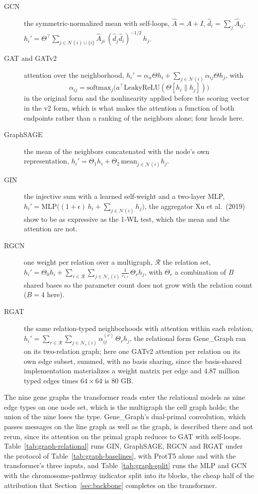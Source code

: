 \begin{description}
  \item[GCN] the symmetric-normalized mean with self-loops, $\hat A = A + I$,
    $\hat d_i = \sum_j \hat A_{ij}$:
    $h_i' = \Theta^{\top} \sum_{j \in \mathcal{N}(i) \cup \{i\}}
    \hat A_{ji}\,(\hat d_j \hat d_i)^{-1/2}\, h_j$.
  \item[GAT and GATv2] attention over the neighborhood,
    $h_i' = \alpha_{ii}\Theta h_i + \sum_{j \in \mathcal{N}(i)} \alpha_{ij}\Theta h_j$,
    with
    \begin{equation*}
      \alpha_{ij} = \mathrm{softmax}_j\big(a^{\top}\mathrm{LeakyReLU}(\Theta[h_i \| h_j])\big)
    \end{equation*}
    in the original form and the nonlinearity applied before the scoring vector in the
    v2 form, which is what makes the attention a function of both endpoints rather
    than a ranking of the neighbors alone; four heads here.
  \item[GraphSAGE] the mean of the neighbors concatenated with the node's own
    representation, $h_i' = \Theta_1 h_i + \Theta_2\,\mathrm{mean}_{j \in \mathcal{N}(i)} h_j$.
  \item[GIN] the injective sum with a learned self-weight and a two-layer MLP,
    $h_i' = \mathrm{MLP}\big((1 + \epsilon)\,h_i + \sum_{j \in \mathcal{N}(i)} h_j\big)$,
    the aggregator Xu et al.\ (2019) show to be as expressive as the 1-WL test, which
    the mean and the attention are not.
  \item[RGCN] one weight per relation over a multigraph, $\mathcal{R}$ the relation set,
    $h_i' = \Theta_0 h_i + \sum_{r \in \mathcal{R}} \sum_{j \in \mathcal{N}_r(i)}
    \frac{1}{c_{i,r}}\,\Theta_r h_j$, with $\Theta_r$ a combination of $B$ shared bases
    so the parameter count does not grow with the relation count ($B = 4$ here).
  \item[RGAT] the same relation-typed neighborhoods with attention within each
    relation, $h_i' = \sum_{r \in \mathcal{R}} \sum_{j \in \mathcal{N}_r(i)}
    \alpha_{ij}^{(r)}\,\Theta_r h_j$, the relational form Gene\_Graph ran on its
    two-relation graph; here one GATv2 attention per relation on its own edge subset,
    summed, with no basis sharing, since the basis-shared implementation materializes
    a weight matrix per edge and 4.87 million typed edges times $64 \times 64$ is 80 GB.
\end{description}

The nine gene graphs the transformer reads enter the relational models as nine edge
types on one node set, which is the multigraph the cell graph holds; the union of the
nine loses the type. Gene\_Graph's dual-primal convolution, which passes messages on
the line graph as well as the graph, is described there and not rerun, since its
attention on the primal graph reduces to GAT with self-loops. Table~\ref{tab:graph-relational}
runs GIN, GraphSAGE, RGCN and RGAT under the protocol of Table~\ref{tab:graph-baselines},
with ProtT5 alone and with the transformer's three inputs, and
Table~\ref{tab:graph-split} runs the MLP and GCN with the chromosome-pathway indicator
split into its blocks, the cheap half of the attribution that Section~\ref{sec:backbone}
completes on the transformer.

